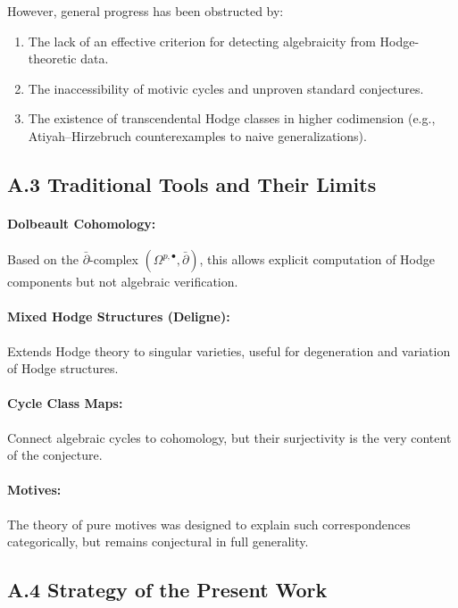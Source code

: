 \documentclass[11pt]{article}
\begin{document}
However, general progress has been obstructed by:

\begin{enumerate}
  \item The lack of an effective criterion for detecting algebraicity from Hodge-theoretic data.
  \item The inaccessibility of motivic cycles and unproven standard conjectures.
  \item The existence of transcendental Hodge classes in higher codimension (e.g., Atiyah–Hirzebruch counterexamples to naive generalizations).
\end{enumerate}

\subsection*{A.3 Traditional Tools and Their Limits}

\paragraph{Dolbeault Cohomology:}
Based on the $\bar{\partial}$-complex $(\Omega^{p,\bullet}, \bar{\partial})$, this allows explicit computation of Hodge components but not algebraic verification.

\paragraph{Mixed Hodge Structures (Deligne):}
Extends Hodge theory to singular varieties, useful for degeneration and variation of Hodge structures.

\paragraph{Cycle Class Maps:}
Connect algebraic cycles to cohomology, but their surjectivity is the very content of the conjecture.

\paragraph{Motives:}
The theory of pure motives was designed to explain such correspondences categorically, but remains conjectural in full generality.

\subsection*{A.4 Strategy of the Present Work}
\end{document}
